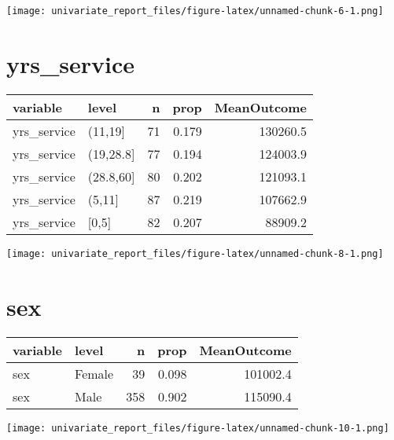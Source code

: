 \documentclass[
]{article}
\begin{document}
\texttt{[image: univariate\_report\_files/figure-latex/unnamed-chunk-6-1.png]}

\hypertarget{yrs_service}{%
\section{yrs\_service}\label{yrs_service}}

\begin{longtable}[]{@{}llrrr@{}}
\toprule
variable & level & n & prop & MeanOutcome\tabularnewline
\midrule
\endhead
yrs\_service & (11,19{]} & 71 & 0.179 & 130260.5\tabularnewline
yrs\_service & (19,28.8{]} & 77 & 0.194 & 124003.9\tabularnewline
yrs\_service & (28.8,60{]} & 80 & 0.202 & 121093.1\tabularnewline
yrs\_service & (5,11{]} & 87 & 0.219 & 107662.9\tabularnewline
yrs\_service & {[}0,5{]} & 82 & 0.207 & 88909.2\tabularnewline
\bottomrule
\end{longtable}

\texttt{[image: univariate\_report\_files/figure-latex/unnamed-chunk-8-1.png]}

\hypertarget{sex}{%
\section{sex}\label{sex}}

\begin{longtable}[]{@{}llrrr@{}}
\toprule
variable & level & n & prop & MeanOutcome\tabularnewline
\midrule
\endhead
sex & Female & 39 & 0.098 & 101002.4\tabularnewline
sex & Male & 358 & 0.902 & 115090.4\tabularnewline
\bottomrule
\end{longtable}

\texttt{[image: univariate\_report\_files/figure-latex/unnamed-chunk-10-1.png]}
\end{document}
